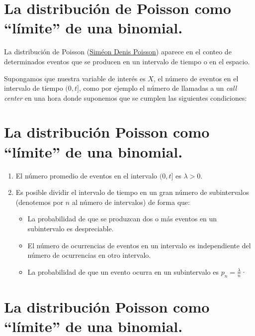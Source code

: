 \documentclass[
  letterpaper,
  DIV=11,
  numbers=noendperiod]{scrreprt}
\providecommand{\tightlist}{%
  \setlength{\itemsep}{0pt}\setlength{\parskip}{0pt}}\usepackage{longtable,booktabs,array}
\begin{document}
\section{La distribución de Poisson como ``límite'' de una
binomial.}\label{la-distribuciuxf3n-de-poisson-como-luxedmite-de-una-binomial.}

La distribución de Poisson
(\href{https://es.wikipedia.org/wiki/Sim\%C3\%A9on_Denis_Poisson}{Siméon
Denis Poisson}) aparece en el conteo de determinados eventos que se
producen en un intervalo de tiempo o en el espacio.

Supongamos que nuestra variable de interés es \(X\), el número de
eventos en el intervalo de tiempo \((0,t]\), como por ejemplo el número
de llamadas a un \emph{call center} en una hora donde suponemos que se
cumplen las siguientes condiciones:

\section{La distribución Poisson como ``límite'' de una
binomial.}\label{la-distribuciuxf3n-poisson-como-luxedmite-de-una-binomial.}

\begin{enumerate}
\def\labelenumi{\arabic{enumi}.}
\tightlist
\item
  El número promedio de eventos en el intervalo \((0,t]\) es
  \(\lambda>0\).
\item
  Es posible dividir el intervalo de tiempo en un gran número de
  subintervalos (denotemos por \(n\) al número de intervalos) de forma
  que:

  \begin{itemize}
  \tightlist
  \item
    La probabilidad de que se produzcan dos o más eventos en un
    subintervalo es despreciable.
  \item
    El número de ocurrencias de eventos en un intervalo es independiente
    del número de ocurrencias en otro intervalo.
  \item
    La probabilidad de que un evento ocurra en un subintervalo es
    \(p_n=\frac{\lambda}{n}\)·
  \end{itemize}
\end{enumerate}

\section{La distribución Poisson como ``límite'' de una
binomial.}\label{la-distribuciuxf3n-poisson-como-luxedmite-de-una-binomial.-1}
\end{document}
